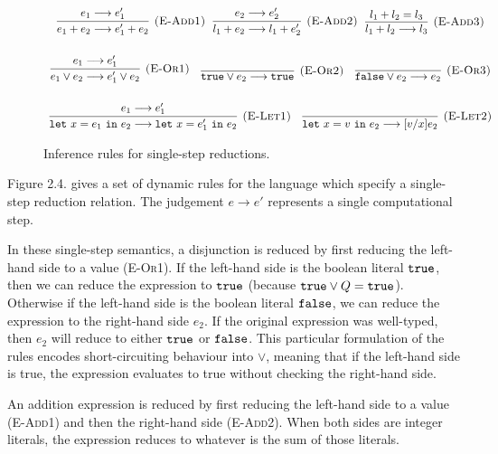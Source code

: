\begin{figure}[h]

\noindent
{}

\[
\begin{array}{c}

\infer[\textsc{(E-Add1)}]
	{e_1 + e_2 \longrightarrow e_1' + e_2}
	{e_1 \longrightarrow e_1'}
~~
\infer[\textsc{(E-Add2)}]
	{l_1 + e_2 \longrightarrow l_1 + e_2'}
	{e_2 \longrightarrow e_2'}
~~
\infer[\textsc{(E-Add3)}]
	{l_1 + l_2 \longrightarrow l_3}
	{l_1 + l_2 = l_3} \\[4ex]

\infer[\textsc{(E-Or1)}]
	{e_1 \lor e_2 \longrightarrow e_1' \lor e_2}
	{e_1 \longrightarrow e_1'}
	~~~
\infer[\textsc{(E-Or2)}]
	{\true \lor e_2 \longrightarrow \true}
	{}
	~~~
\infer[\textsc{(E-Or3)}]
	{\false \lor e_2 \longrightarrow e_2}
	{}\\[4ex]
	
\infer[\textsc{(E-Let1)}]
	{\letxpr{x}{e_1}{e_2} \longrightarrow \letxpr{x}{e_1'}{e_2}}
	{e_1 \longrightarrow e_1'}
	~~~
\infer[\textsc{(E-Let2)}]
	{\letxpr{x}{v}{e_2} \longrightarrow [v/x]e_2}
	{}

\end{array}
\]


\vspace{-7pt}
\caption{Inference rules for single-step reductions.}
\label{A sample. }
\end{figure}

Figure 2.4. gives a set of dynamic rules for the language which specify a single-step reduction relation. The judgement $e \longrightarrow e'$ represents a single computational step.

In these single-step semantics, a disjunction is reduced by first reducing the left-hand side to a value (\textsc{E-Or1}). If the left-hand side is the boolean literal $\mathtt{true}$, then we can reduce the expression to $\mathtt{true}$ (because $\mathtt{true} \lor Q = \mathtt{true}$). Otherwise if the left-hand side is the boolean literal $\mathtt{false}$, we can reduce the expression to the right-hand side $e_2$. If the original expression was well-typed, then $e_2$ will reduce to either $\mathtt{true}$ or $\mathtt{false}$. This particular formulation of the rules encodes short-circuiting behaviour into $\lor$, meaning that if the left-hand side is true, the expression evaluates to true without checking the right-hand side.

An addition expression is reduced by first reducing the left-hand side to a value (\textsc{E-Add1}) and then the right-hand side (\textsc{E-Add2}). When both sides are integer literals, the expression reduces to whatever is the sum of those literals.

